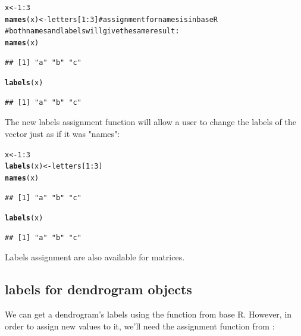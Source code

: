 \documentclass[shortnames,nojss,article]{jss}\usepackage{graphicx, color}
\makeatletter
\newcommand{\hlfunctioncall}[1]{\textcolor[rgb]{0.501960784313725,0,0.329411764705882}{\textbf{#1}}}%
\newcommand{\hlcomment}[1]{\textcolor[rgb]{0.180392156862745,0.6,0.341176470588235}{#1}}%
\newenvironment{kframe}{%
 \def\at@end@of@kframe{}%
 \ifinner\ifhmode%
  \def\at@end@of@kframe{\end{minipage}}%
  \begin{minipage}{\columnwidth}%
 \fi\fi%
 \def\FrameCommand##1{\hskip\@totalleftmargin \hskip-\fboxsep
 \colorbox{shadecolor}{##1}\hskip-\fboxsep
     \hskip-\linewidth \hskip-\@totalleftmargin \hskip\columnwidth}%
 \MakeFramed {\advance\hsize-\width
   \@totalleftmargin\z@ \linewidth\hsize
   \@setminipage}}%
 {\par\unskip\endMakeFramed%
 \at@end@of@kframe}
\newenvironment{knitrout}{}{} %
\makeatother
\begin{document}
\begin{knitrout}
\color{fgcolor}\begin{kframe}
\begin{alltt}
x <- 1:3
\hlfunctioncall{names}(x) <- letters[1:3]  \hlcomment{# assignment for names is in base R}
\hlcomment{# both names and labels will give the same result:}
\hlfunctioncall{names}(x)
\end{alltt}
\begin{verbatim}
## [1] "a" "b" "c"
\end{verbatim}
\begin{alltt}
\hlfunctioncall{labels}(x)
\end{alltt}
\begin{verbatim}
## [1] "a" "b" "c"
\end{verbatim}
\end{kframe}
\end{knitrout}



The new labels assignment function will allow a user to change the labels of the vector just as if it was "names":

\begin{knitrout}
\color{fgcolor}\begin{kframe}
\begin{alltt}
x <- 1:3
\hlfunctioncall{labels}(x) <- letters[1:3]
\hlfunctioncall{names}(x)
\end{alltt}
\begin{verbatim}
## [1] "a" "b" "c"
\end{verbatim}
\begin{alltt}
\hlfunctioncall{labels}(x)
\end{alltt}
\begin{verbatim}
## [1] "a" "b" "c"
\end{verbatim}
\end{kframe}
\end{knitrout}


Labels assignment are also available for matrices.


\subsection{labels for dendrogram objects}

We can get a dendrogram's labels using the  function from base R. However, in order to assign new values to it, we'll need the assignment function from :
\end{document}
